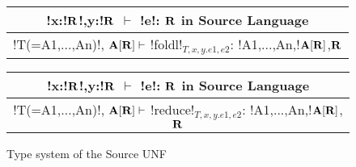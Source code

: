 \begin{figure*}[tb]
    \begin{tabular}{c}
        !x:!$\mathbf{R}$!,y:!$\mathbf{R}$ $\vdash$ !e!: $\mathbf{R}$ in Source Language
        \\\hline  
        !T(=A1,...,An)!, $\mathbf{A}[\mathbf{R}] \vdash$ !foldl!$_{T, x,y.e1, e2}$: !A1,...,An,!$\mathbf{A}[\mathbf{R}]$,$\mathbf{R}$
    \end{tabular}

    \begin{tabular}{c}
        !x:!$\mathbf{R}$!,y:!$\mathbf{R}$ $\vdash$ !e!: $\mathbf{R}$ in Source Language
        \\\hline  
        !T(=A1,...,An)!, $\mathbf{A}[\mathbf{R}] \vdash$ !reduce!$_{T, x,y.e1, e2}$: !A1,...,An,!$\mathbf{A}[\mathbf{R}]$,$\mathbf{R}$
    \end{tabular}
    \vspace{-0.2cm}
    \caption{Type system of the Source UNF}
    \vspace{-0.4cm}
    \label{fig:source_unf_typesystem}
\end{figure*}